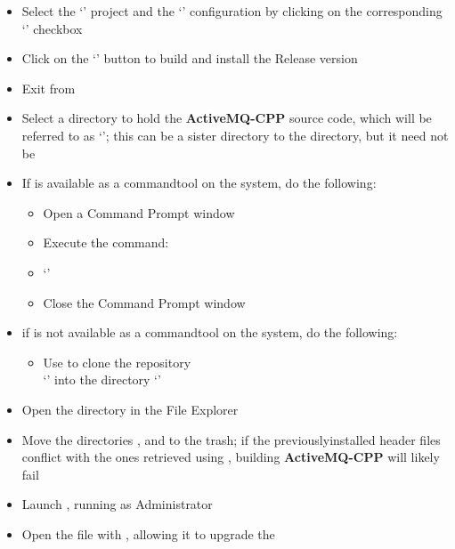 \begin{itemize}
\item\exSp{}Select the `' project and the `'
configuration by clicking on the corresponding `' checkbox
\item\exSp{}Click on the `' button to build and install the Release
version
\item\exSp{}Exit from 
\item\exSp{}Select a directory to hold the \textbf{ActiveMQ-CPP} source code, which will
be referred to as `'; this can be a sister directory to the
 directory, but it need not be
\item\exSp{}If  is available as a command\longDash{}tool on the system, do the
following:
\begin{itemize}
\item Open a Command Prompt window
\item\exSp{}Execute the command:
\item `'
\item\exSp{}Close the Command Prompt window
\end{itemize}
\item\exSp{}if  is not available as a command\longDash{}tool on the system, do
the following:
\begin{itemize}
\item Use  to clone the repository\\
`' into the directory
`'
\end{itemize}
\item\exSp{}Open the directory  in the File Explorer
\item\exSp{}Move the directories ,  and  to the
trash;
if the previously\longDash{}installed header files conflict with the ones retrieved using
, building \textbf{ActiveMQ-CPP} will likely fail
\item\exSp{}Launch , running as Administrator
\item\exSp{}Open the file
 with , allowing it to upgrade the

\end{itemize}
